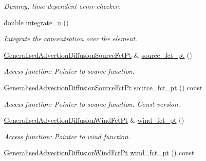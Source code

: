 \begin{DoxyCompactItemize}
\begin{DoxyCompactList}\small\item\em Dummy, time dependent error checker. \end{DoxyCompactList}\item 
double \hyperlink{classoomph_1_1GeneralisedAdvectionDiffusionEquations_ad4651d1bd8d4da68f5d3d5acb45f659b}{integrate\+\_\+u} ()
\begin{DoxyCompactList}\small\item\em Integrate the concentration over the element. \end{DoxyCompactList}\item 
\hyperlink{classoomph_1_1GeneralisedAdvectionDiffusionEquations_ad65d34bc0348f8b297c185d1772eafd9}{Generalised\+Advection\+Diffusion\+Source\+Fct\+Pt} \& \hyperlink{classoomph_1_1GeneralisedAdvectionDiffusionEquations_aa25d13de883e0ee197b050eb6e1c22b0}{source\+\_\+fct\+\_\+pt} ()
\begin{DoxyCompactList}\small\item\em Access function\+: Pointer to source function. \end{DoxyCompactList}\item 
\hyperlink{classoomph_1_1GeneralisedAdvectionDiffusionEquations_ad65d34bc0348f8b297c185d1772eafd9}{Generalised\+Advection\+Diffusion\+Source\+Fct\+Pt} \hyperlink{classoomph_1_1GeneralisedAdvectionDiffusionEquations_ad6c539f5291e125e41ead1323c4f89bd}{source\+\_\+fct\+\_\+pt} () const
\begin{DoxyCompactList}\small\item\em Access function\+: Pointer to source function. Const version. \end{DoxyCompactList}\item 
\hyperlink{classoomph_1_1GeneralisedAdvectionDiffusionEquations_ac5a63eb03aee5957e7b14a4578423cfc}{Generalised\+Advection\+Diffusion\+Wind\+Fct\+Pt} \& \hyperlink{classoomph_1_1GeneralisedAdvectionDiffusionEquations_a03c11fe6f8c2244b831b0a240e6b42ef}{wind\+\_\+fct\+\_\+pt} ()
\begin{DoxyCompactList}\small\item\em Access function\+: Pointer to wind function. \end{DoxyCompactList}\item 
\hyperlink{classoomph_1_1GeneralisedAdvectionDiffusionEquations_ac5a63eb03aee5957e7b14a4578423cfc}{Generalised\+Advection\+Diffusion\+Wind\+Fct\+Pt} \hyperlink{classoomph_1_1GeneralisedAdvectionDiffusionEquations_a51b286f75d62c1d9b62961555615d560}{wind\+\_\+fct\+\_\+pt} () const

\end{DoxyCompactItemize}
